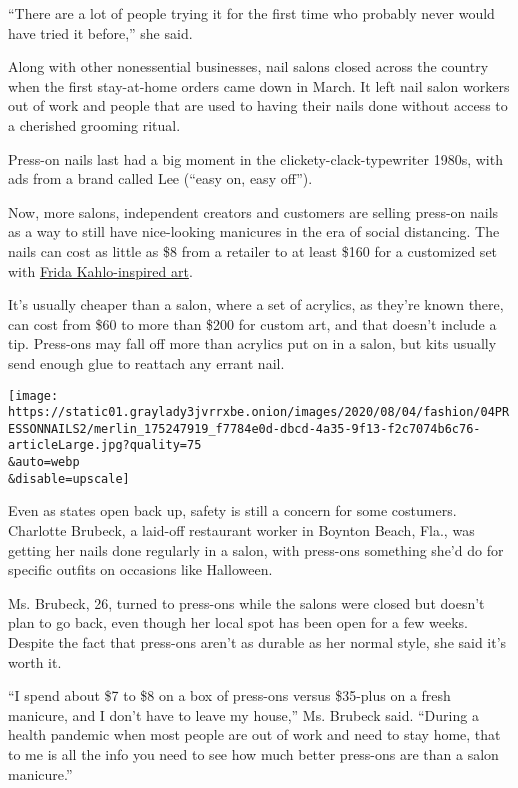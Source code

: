 ``There are a lot of people trying it for the first time who probably
never would have tried it before,'' she said.

Along with other nonessential businesses, nail salons closed across the
country when the first stay-at-home orders came down in March. It left
nail salon workers out of work and people that are used to having their
nails done without access to a cherished grooming ritual.

Press-on nails last had a big moment in the clickety-clack-typewriter
1980s, with ads from a brand called Lee (``easy on, easy off'').

Now, more salons, independent creators and customers are selling
press-on nails as a way to still have nice-looking manicures in the era
of social distancing. The nails can cost as little as \$8 from a
retailer to at least \$160 for a customized set with
\href{https://www.etsy.com/listing/788328318/unique-frida-kahlo-inspired-nails-luxury?ref=shop_home_active_1\&frs=1}{Frida
Kahlo-inspired art}.

It's usually cheaper than a salon, where a set of acrylics, as they're
known there, can cost from \$60 to more than \$200 for custom art, and
that doesn't include a tip. Press-ons may fall off more than acrylics
put on in a salon, but kits usually send enough glue to reattach any
errant nail.

\texttt{[image: https://static01.graylady3jvrrxbe.onion/images/2020/08/04/fashion/04PRESSONNAILS2/merlin\_175247919\_f7784e0d-dbcd-4a35-9f13-f2c7074b6c76-articleLarge.jpg?quality=75\\\&auto=webp\\\&disable=upscale]}

Even as states open back up, safety is still a concern for some
costumers. Charlotte Brubeck, a laid-off restaurant worker in Boynton
Beach, Fla., was getting her nails done regularly in a salon, with
press-ons something she'd do for specific outfits on occasions like
Halloween.

Ms. Brubeck, 26, turned to press-ons while the salons were closed but
doesn't plan to go back, even though her local spot has been open for a
few weeks. Despite the fact that press-ons aren't as durable as her
normal style, she said it's worth it.

``I spend about \$7 to \$8 on a box of press-ons versus \$35-plus on a
fresh manicure, and I don't have to leave my house,'' Ms. Brubeck said.
``During a health pandemic when most people are out of work and need to
stay home, that to me is all the info you need to see how much better
press-ons are than a salon manicure.''

